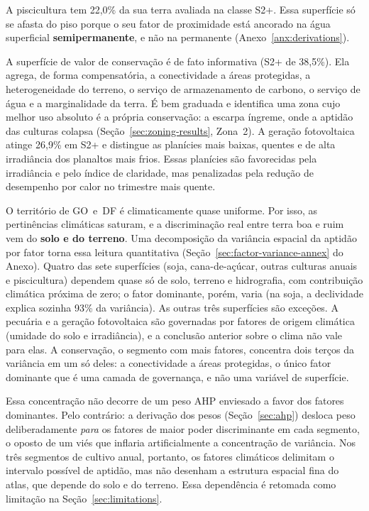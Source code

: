 A piscicultura tem 22,0\% da sua terra avaliada na classe S2+. Essa superfície só se afasta do piso
porque o seu fator de proximidade está ancorado na água superficial \textbf{semipermanente}, e
não na permanente (Anexo~\ref{anx:derivations}).

A superfície de valor de conservação é de fato informativa (S2+ de 38,5\%). Ela agrega, de forma
compensatória, a conectividade a áreas protegidas, a heterogeneidade do terreno, o serviço de
armazenamento de carbono, o serviço de água e a marginalidade da terra. É bem graduada e identifica
uma zona cujo melhor uso absoluto é a própria conservação: a escarpa íngreme, onde a
aptidão das culturas colapsa (Seção~\ref{sec:zoning-results}, Zona~2). A geração fotovoltaica
atinge 26,9\% em S2+ e distingue as planícies mais baixas, quentes e de alta irradiância dos
planaltos mais frios. Essas planícies são favorecidas pela irradiância e pelo índice de claridade,
mas penalizadas pela redução de desempenho por calor no trimestre mais quente.

O território de GO~e~DF é climaticamente quase uniforme. Por isso, as pertinências climáticas saturam,
e a discriminação real entre terra boa e ruim vem do \textbf{solo e do terreno}. Uma decomposição da
variância espacial da aptidão por fator torna essa leitura quantitativa
(Seção~\ref{sec:factor-variance-annex} do Anexo). Quatro das sete superfícies (soja, cana-de-açúcar,
outras culturas anuais e piscicultura) dependem quase só de solo, terreno e hidrografia, com
contribuição climática próxima de zero; o fator dominante, porém, varia (na soja, a declividade
explica sozinha 93\% da variância). As outras três superfícies são exceções. A pecuária e a geração
fotovoltaica são governadas por fatores de origem climática (umidade do solo e irradiância), e a
conclusão anterior sobre o clima não vale para elas. A conservação, o segmento com mais fatores,
concentra dois terços da variância em um só deles: a conectividade a áreas protegidas, o único fator
dominante que é uma camada de governança, e não uma variável de superfície.

Essa concentração não decorre de um peso AHP enviesado a favor dos fatores dominantes. Pelo
contrário: a derivação dos pesos (Seção~\ref{sec:ahp}) desloca peso deliberadamente \emph{para} os
fatores de maior poder discriminante em cada segmento, o oposto de um viés que inflaria
artificialmente a concentração de variância. Nos três segmentos de cultivo anual, portanto, os fatores
climáticos delimitam o intervalo possível de aptidão, mas não desenham a estrutura espacial fina do
atlas, que depende do solo e do terreno. Essa dependência é retomada como limitação na
Seção~\ref{sec:limitations}.


